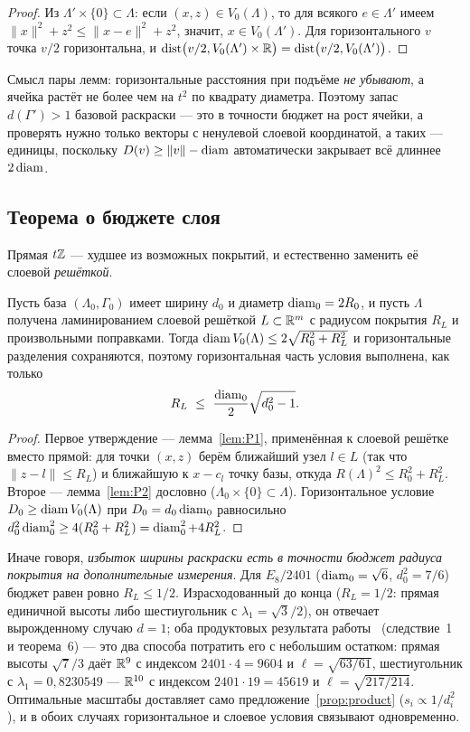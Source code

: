 \begin{proof}
Из $\Lambda'\times\{0\}\subset\Lambda$: если $(x,z)\in V_0(\Lambda)$, то для
всякого $e\in\Lambda'$ имеем $\|x\|^2+z^2\le\|x-e\|^2+z^2$, значит,
$x\in V_0(\Lambda')$. Для горизонтального $v$ точка $v/2$ горизонтальна, и
$\operatorname{dist}\bigl(v/2,V_0(\Lambda')\times\mathbb{R}\bigr)=\operatorname{dist}\bigl(v/2,V_0(\Lambda')\bigr)$.
\end{proof}

Смысл пары лемм: горизонтальные расстояния при подъёме \emph{не убывают}, а
ячейка растёт не более чем на $t^2$ по квадрату диаметра. Поэтому запас
$d(\Gamma')>1$ базовой раскраски --- это в точности бюджет на рост ячейки, а
проверять нужно только векторы с ненулевой слоевой координатой, а таких ---
единицы, поскольку $D(v)\ge\|v\|-\operatorname{diam}$ автоматически закрывает всё длиннее
$2\operatorname{diam}$.

\subsection{Теорема о бюджете слоя}
\label{ssec:layerbudget}

Прямая $t\mathbb{Z}$ --- худшее из возможных покрытий, и естественно заменить её
слоевой \emph{решёткой}.

\begin{proposition}\label{prop:layerbudget}
Пусть база $(\Lambda_0,\Gamma_0)$ имеет ширину $d_0$ и диаметр $\operatorname{diam}_0=2R_0$, и
пусть $\Lambda$ получена ламинированием слоевой решёткой $L\subset\mathbb{R}^m$ с
радиусом покрытия $R_L$ и произвольными поправками. Тогда
$\operatorname{diam} V_0(\Lambda)\le2\sqrt{R_0^2+R_L^2}$ и горизонтальные разделения
сохраняются, поэтому горизонтальная часть условия выполнена, как только
\[
R_L\ \le\ \frac{\diam_0}{2}\sqrt{d_0^2-1}.
\]
\end{proposition}

\begin{proof}
Первое утверждение --- лемма~\ref{lem:P1}, применённая к слоевой решётке
вместо прямой: для точки $(x,z)$ берём ближайший узел $l\in L$ (так что
$\|z-l\|\le R_L$) и ближайшую к $x-c_l$ точку базы, откуда
$R(\Lambda)^2\le R_0^2+R_L^2$. Второе --- лемма~\ref{lem:P2} дословно
($\Lambda_0\times\{0\}\subset\Lambda$). Горизонтальное условие
$D_0\ge\operatorname{diam} V_0(\Lambda)$ при $D_0=d_0\operatorname{diam}_0$ равносильно
$d_0^2\operatorname{diam}_0^2\ge4(R_0^2+R_L^2)=\operatorname{diam}_0^2+4R_L^2$.
\end{proof}

Иначе говоря, \emph{избыток ширины раскраски есть в точности бюджет радиуса
покрытия на дополнительные измерения}. Для $E_8/2401$ ($\operatorname{diam}_0=\sqrt6$,
$d_0^2=7/6$) бюджет равен ровно $R_L\le1/2$. Израсходованный до конца
($R_L=1/2$: прямая единичной высоты либо шестиугольник с
$\lambda_1=\sqrt3/2$), он отвечает вырожденному случаю $d=1$; оба
продуктовых результата работы~\cite{Bounds} (следствие~1 и теорема~6) --- это
два способа потратить его с небольшим остатком: прямая высоты $\sqrt7/3$ даёт $\mathbb{R}^9$ с индексом
$2401\cdot4=9604$ и $\ell=\sqrt{63/61}$, шестиугольник с
$\lambda_1=0{,}8230549$ --- $\mathbb{R}^{10}$ с индексом $2401\cdot19=45619$ и
$\ell=\sqrt{217/214}$. Оптимальные масштабы
доставляет само предложение~\ref{prop:product} ($s_i\propto1/d_i^2$), и в
обоих случаях горизонтальное и слоевое условия связывают одновременно.

